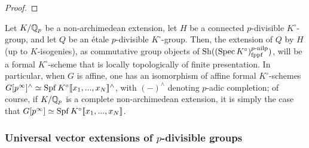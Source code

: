                 \begin{proof}
                        
                \end{proof}
            \begin{corollary} \label{coro: extensions_of_etale_p_divisible_groups_by_connected_p_divisible_groups}
                Let $K/\mathbb{Q}_p$ be a non-archimedean extension, let $H$ be a connected $p$-divisible $K^{\circ}$-group, and let $Q$ be an \'etale $p$-divisible $K^{\circ}$-group. Then, the extension of $Q$ by $H$ (up to $K$-isogenies), as commutative group objects of $\mathrm{Sh}((\operatorname{Spec} K^{\circ})_{\mathrm{fppf}}^{p\text{-}\mathrm{nilp}})$, will be a formal $K^{\circ}$-scheme that is locally topologically of finite presentation. In particular, when $G$ is affine, one has an isomorphism of affine formal $K^{\circ}$-schemes $G[p^{\infty}]^{\wedge} \simeq \operatorname{Spf} K^{\circ}[\![x_1, ..., x_N]\!]^{\wedge}$, with $(-)^{\wedge}$ denoting $p$-adic completion; of course, if $K/\mathbb{Q}_p$ is a complete non-archimedean extension, it is simply the case that $G[p^{\infty}] \simeq \operatorname{Spf} K^{\circ}[\![x_1, ..., x_N]\!]$.
            \end{corollary}
                
        \subsubsection{Universal vector extensions of \texorpdfstring{$p$}{}-divisible groups}
        
